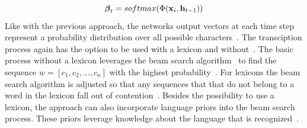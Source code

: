 \begin{equation}\label{eq:attention-gate-values}
    \boldsymbol{\beta}_{t}=softmax(\Phi(\textbf{x}_i,\textbf{h}_{t-1}))
\end{equation}
Like with the previous approach, the networks output vectors at each time step represent a
probability distribution over all possible characters~\citep{ghosh_visual_2017}.
The transciption process again has the option to be used with a lexicon and
without~\citep{ghosh_visual_2017}.
The basic process without a lexicon leverages the beam search algorithm~\citep{ghosh_visual_2017}
to find the sequence $w=[c_1,c_2,\ldots,c_n]$ with the highest
probability~\citep{ghosh_visual_2017}.
For lexicons the beam search algorithm is adjusted so that any sequences that that do not belong
to a word in the lexicon fall out of contention~\citep{ghosh_visual_2017}.
Besides the possibility to use a lexicon, the approach can also incorporate language priors into
the beam search process.
These priors leverage knowledge about the language that is recognized~\citep{ghosh_visual_2017}.

